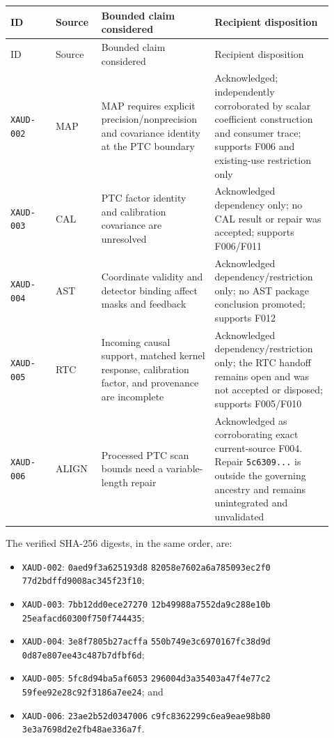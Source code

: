 \documentclass[11pt]{article}
\newcommand{\code}[1]{\nolinkurl{#1}}
\newcommand{\digest}[8]{\code{#1}\allowbreak\code{#2}\allowbreak%
  \code{#3}\allowbreak\code{#4}\allowbreak\code{#5}\allowbreak%
  \code{#6}\allowbreak\code{#7}\allowbreak\code{#8}}
\begin{document}
\begin{longtable}{L{0.13\linewidth}L{0.13\linewidth}L{0.32\linewidth}L{0.34\linewidth}}
\toprule
ID & Source & Bounded claim considered & Recipient disposition\\
\midrule
\endfirsthead
\toprule
ID & Source & Bounded claim considered & Recipient disposition\\
\midrule
\endhead
\code{XAUD-002} &
MAP &
MAP requires explicit precision/nonprecision and covariance identity at the
PTC boundary &
Acknowledged; independently corroborated by scalar coefficient construction
and consumer trace; supports F006 and existing-use restriction only\\
\code{XAUD-003} &
CAL &
PTC factor identity and calibration covariance are unresolved &
Acknowledged dependency only; no CAL result or repair was accepted; supports
F006/F011\\
\code{XAUD-004} &
AST &
Coordinate validity and detector binding affect masks and feedback &
Acknowledged dependency/restriction only; no AST package conclusion promoted;
supports F012\\
\code{XAUD-005} &
RTC &
Incoming causal support, matched kernel response, calibration factor, and
provenance are incomplete &
Acknowledged dependency/restriction only; the RTC handoff remains open and
was not accepted or disposed; supports F005/F010\\
\code{XAUD-006} &
ALIGN &
Processed PTC scan bounds need a variable-length repair &
Acknowledged as corroborating exact current-source F004.  Repair
\code{5c6309...} is outside the governing ancestry and remains unintegrated
and unvalidated\\
\bottomrule
\end{longtable}

The verified SHA-256 digests, in the same order, are:
\begin{itemize}[leftmargin=*]
\item \code{XAUD-002}: \digest{0aed9f3a}{625193d8}{82058e76}{02a6a785}{093ec2f0}{77d2bdff}{d9008ac3}{45f23f10};
\item \code{XAUD-003}: \digest{7bb12dd0}{ece27270}{12b49988}{a7552da9}{c288e10b}{25eafacd}{60300f75}{0f744435};
\item \code{XAUD-004}: \digest{3e8f7805}{b27acffa}{550b749e}{3c697016}{7fc38d9d}{0d87e807}{ee43c487}{b7dfbf6d};
\item \code{XAUD-005}: \digest{5fc8d94b}{a5af6053}{296004d3}{a35403a4}{7f4e77c2}{59fee92e}{28c92f31}{86a7ee24}; and
\item \code{XAUD-006}: \digest{23ae2b52}{d0347006}{c9fc8362}{299c6ea9}{eae98b80}{3e3a7698}{d2e2fb48}{ae336a7f}.
\end{itemize}
\end{document}
